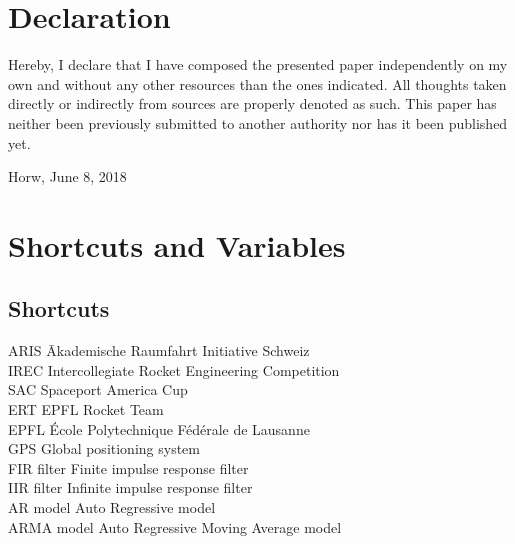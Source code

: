 \documentclass[a4paper, english, 10pt]{report}
\begin{document}
\chapter*{Declaration}
\thispagestyle{empty}
Hereby, I declare that I have composed the presented paper independently on my own and without any other resources than the ones indicated. All thoughts
taken directly or indirectly from sources are properly denoted as such.
This paper has neither been previously submitted to another authority nor has it been published yet.

\vspace{2cm}
Horw, June 8, 2018

\begin{abstract}

\end{abstract}
\tableofcontents

\chapter*{Shortcuts and Variables}
\section*{Shortcuts}
\begin{tabbing}
 ARIS    \hspace{5cm} \= Akademische Raumfahrt Initiative Schweiz \\
 IREC 		\> Intercollegiate Rocket Engineering Competition \\
 SAC		\> Spaceport America Cup \\
 ERT		\> EPFL Rocket Team \\
 EPFL	  	\> École Polytechnique Fédérale de Lausanne \\
 GPS 		\> Global positioning system \\
 FIR filter 	\> Finite impulse response filter\\
 IIR filter 	\> Infinite impulse response filter\\
 AR model 	\> Auto Regressive model\\
 ARMA model 	\> Auto Regressive Moving Average model \\


\end{tabbing}
\end{document}
